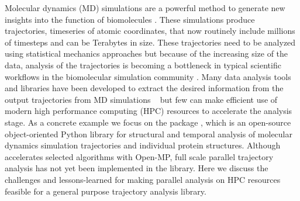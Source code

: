 \label{sec:introduction}
Molecular dynamics (MD) simulations are a powerful method to generate new insights into the function of biomolecules \citep{Borhani:2012mi, Dror:2012cr, Orozco:2014dq, Perilla:2015kx, Bottaro:2018aa}.
These simulations produce trajectories, timeseries of atomic coordinates, that now routinely include millions of timesteps and can be Terabytes in size.
These trajectories need to be analyzed using statistical mechanics approaches \cite{Mura:2014kx} but because of the increasing size of the data, analysis of the trajectories is becoming a bottleneck in typical scientific workflows in the biomolecular simulation community \cite{Cheatham:2015}.
Many data analysis tools and libraries have been developed to extract the desired information from the output trajectories from MD simulations ~\cite{nmoldyn, nmoldyn-2012, Hum96, Hinsen:2000kx, Grant:2006ud, himach-2008, Romo:2009zr, Romo:2014bh, Michaud-Agrawal:2011fu, Gowers:2016aa, cpptraj-2013, mdtraj-2015, pteros2015, Doerr:2016aa} but few can make efficient use of modern high performance computing (HPC) resources to accelerate the analysis stage.
As a concrete example we focus on the  package \citep{Gowers:2016aa,Michaud-Agrawal:2011fu}, which is an open-source object-oriented Python library for structural and temporal analysis of molecular dynamics simulation trajectories and individual protein structures.
Although  accelerates selected algorithms with Open-MP, full scale parallel trajectory analysis has not yet been implemented in the library.
Here we discuss the challenges and lessons-learned for making parallel analysis on HPC resources feasible for a general purpose trajectory analysis library.

